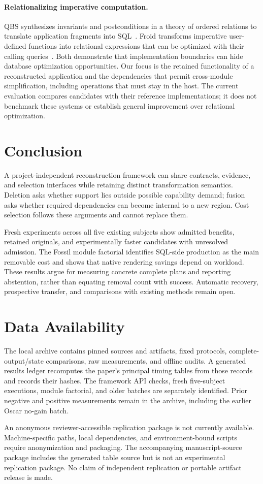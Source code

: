 \documentclass[acmsmall,screen,review,anonymous]{acmart}
\begin{document}
\paragraph{Relationalizing imperative computation.}
QBS synthesizes invariants and postconditions in a theory of ordered relations
to translate application fragments into SQL~\cite{qbs}. Froid transforms
imperative user-defined functions into relational expressions that can be
optimized with their calling queries~\cite{froid}. Both demonstrate that
implementation boundaries can hide database optimization opportunities.
Our focus is the retained functionality of a reconstructed application and the
dependencies that permit cross-module simplification, including operations
that must stay in the host. The current evaluation compares candidates with
their reference implementations; it does not benchmark these systems or
establish general improvement over relational optimization.

\section{Conclusion}
A project-independent reconstruction framework can share contracts, evidence,
and selection interfaces while retaining distinct transformation semantics.
Deletion asks whether support lies outside possible capability demand; fusion
asks whether required dependencies can become internal to a new region. Cost
selection follows these arguments and cannot replace them.

Fresh experiments across all five existing subjects show admitted benefits,
retained originals, and experimentally faster candidates with unresolved
admission. The Fossil module factorial identifies SQL-side production as the
main removable cost and shows that native rendering savings depend on workload.
These results argue for measuring concrete complete plans and reporting
abstention, rather than equating removal count with success. Automatic recovery,
prospective transfer, and comparisons with existing methods remain open.

\section*{Data Availability}
The local archive contains pinned sources and artifacts, fixed protocols,
complete-output/state comparisons, raw measurements, and offline audits.
A generated results ledger recomputes the paper's principal timing tables from
those records and records their hashes. The framework API checks, fresh five-subject executions, module factorial,
and older batches are separately identified. Prior negative and positive
measurements remain in the archive, including the earlier Oscar no-gain batch.

An anonymous reviewer-accessible replication package is not currently available.
Machine-specific paths, local dependencies, and environment-bound scripts require
anonymization and packaging. The accompanying manuscript-source package includes
the generated table source but is not an experimental replication package.
No claim of independent replication or portable artifact release is made.



\end{document}

